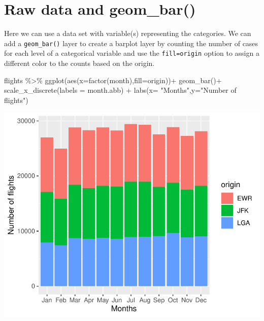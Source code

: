 \documentclass[
  letterpaper,
  DIV=11,
  numbers=noendperiod]{scrartcl}
\newenvironment{Shaded}{\begin{snugshade}}{\end{snugshade}}
\newcommand{\AttributeTok}[1]{\textcolor[rgb]{0.40,0.45,0.13}{#1}}
\newcommand{\FunctionTok}[1]{\textcolor[rgb]{0.28,0.35,0.67}{#1}}
\newcommand{\NormalTok}[1]{\textcolor[rgb]{0.00,0.23,0.31}{#1}}
\newcommand{\SpecialCharTok}[1]{\textcolor[rgb]{0.37,0.37,0.37}{#1}}
\newcommand{\StringTok}[1]{\textcolor[rgb]{0.13,0.47,0.30}{#1}}
\begin{document}
\section{Raw data and geom\_bar()}

Here we can use a data set with variable(s) representing the categories.
We can add a \texttt{geom\_bar()} layer to create a barplot layer by
counting the number of cases for each level of a categorical variable
and use the \texttt{fill=origin} option to assign a different color to
the counts based on the origin.

\begin{Shaded}
\begin{Highlighting}[]
\NormalTok{flights }\SpecialCharTok{\%\textgreater{}\%}
  \FunctionTok{ggplot}\NormalTok{(}\FunctionTok{aes}\NormalTok{(}\AttributeTok{x=}\FunctionTok{factor}\NormalTok{(month),}\AttributeTok{fill=}\NormalTok{origin))}\SpecialCharTok{+}
  \FunctionTok{geom\_bar}\NormalTok{()}\SpecialCharTok{+}
  \FunctionTok{scale\_x\_discrete}\NormalTok{(}\AttributeTok{labels =}\NormalTok{ month.abb) }\SpecialCharTok{+}
  \FunctionTok{labs}\NormalTok{(}\AttributeTok{x=} \StringTok{"Months"}\NormalTok{,}\AttributeTok{y=}\StringTok{"Number of flights"}\NormalTok{)}
\end{Highlighting}
\end{Shaded}

\begin{center}
\includegraphics{notes_files/figure-pdf/Barplot for unaggregated count data-1.pdf}
\end{center}
\end{document}

